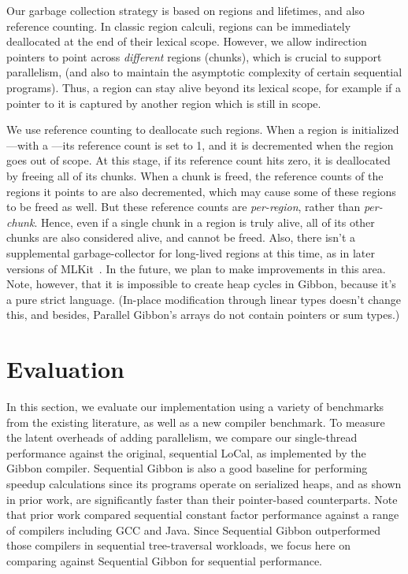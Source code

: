 \documentclass[acmsmall,acmthm=false,nonacm]{acmart}
\theoremstyle{straighttext0}
\theoremstyle{straighttext}
\newcommand{\new}[1]{#1}
\begin{document}
{Our garbage collection strategy is based on regions and lifetimes, and also reference counting.
%
In classic region calculi, regions can be immediately deallocated at the end of their lexical scope.
%
However, we allow indirection pointers to point across {\em different} regions (chunks),
which is crucial to support parallelism, (and also to maintain the asymptotic complexity
of certain sequential programs).
%
Thus, a region can stay alive beyond its lexical scope, for example if a pointer to
it is captured by another region which is still in scope.


We use reference counting to deallocate such regions.
%
When a region is initialized---with a ---its reference count is set to 1,
and it is decremented when the region goes out of scope.
%
At this stage, if its reference count hits zero, it is deallocated by freeing
all of its chunks.
%
When a chunk is freed, the reference counts of the regions it points to are also decremented,
which may cause some of these regions to be freed as well.
%
But these reference counts are {\em per-region}, rather than {\em per-chunk}.
Hence, even if a single chunk in a region is truly alive, all of its other chunks are also
considered alive, and cannot be freed.
%
%
Also, there isn't a supplemental garbage-collector for long-lived regions at this time,
as in later versions of MLKit~\cite{mlkit-retrospective}.
%
%
In the future, we plan to make improvements in this area.
%
Note, however, that it is impossible to create heap cycles in Gibbon, because it's a pure strict language. (In-place modification through linear types doesn't change this, and besides, Parallel Gibbon's arrays do not contain pointers or sum types.)


\section{Evaluation}
\label{sec:evaluation}


In this section, we evaluate our implementation using a variety of
benchmarks from the existing literature, as well as a new compiler benchmark.
%
To measure the latent overheads of adding parallelism,
we compare our single-thread performance
against the original, sequential LoCal, as implemented by the Gibbon compiler.
%
Sequential Gibbon is also a good baseline for performing speedup calculations
since its programs operate on serialized heaps, and
as shown in prior work, are significantly faster than their pointer-based counterparts.
%
Note that prior work \cite{Gibbon} compared sequential constant factor performance
against a range of compilers including GCC and Java.  Since Sequential Gibbon
outperformed those compilers in sequential tree-traversal workloads, we focus
here on comparing against Sequential Gibbon for sequential performance.

}
\end{document}
